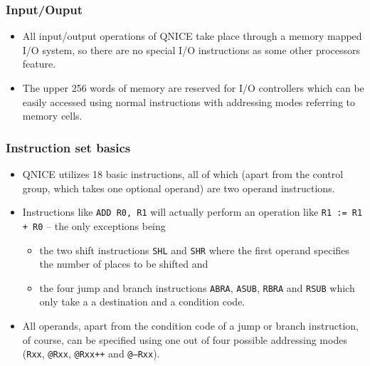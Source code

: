 \documentclass{beamer}
\begin{document}
%
   \begin{frame}
    \frametitle{Input/Ouput}
    \begin{itemize}
     \item All input/output operations of QNICE take place through
      a memory mapped I/O system, so there are no special I/O instructions
      as some other processors feature.
     \item The upper 256 words of memory are reserved for I/O controllers
      which can be easily accessed using normal instructions with
      addressing modes referring to memory cells.
    \end{itemize}
   \end{frame}
%
   \begin{frame}
    \frametitle{Instruction set basics}
    \begin{itemize}
     \item QNICE utilizes 18 basic instructions, all of which (apart
      from the control group, which takes one optional operand) are two 
      operand instructions. 
     \item Instructions like {\tt ADD R0, R1} will actually perform an
      operation like {\tt R1 := R1 + R0} -- the only exceptions being
      \begin{itemize}
       \item the two shift instructions {\tt SHL} and {\tt SHR} where the 
        first operand specifies the number of places to be shifted and
       \item the four jump and branch instructions {\tt ABRA}, {\tt ASUB},
        {\tt RBRA} and {\tt RSUB} which only take a 
        a destination and a condition code.
      \end{itemize}
     \item All operands, apart from the condition code of a jump or
      branch instruction, of course, can be specified using one out
      of four possible addressing modes ({\tt Rxx}, {\tt @Rxx}, {\tt @Rxx++} 
      and {\tt @--Rxx}).
    \end{itemize}
   \end{frame}
\end{document}
